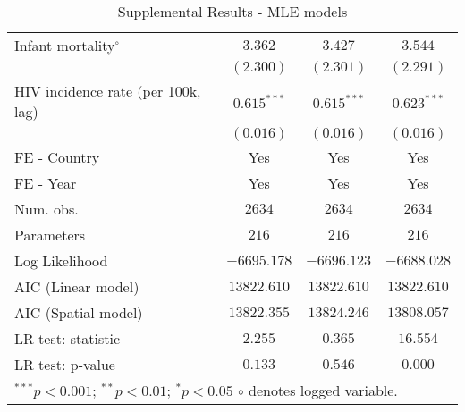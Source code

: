 \begin{sidewaystable}
\begin{center}
{\begin{tabular}{l@{} c@{} c@{} c@{}}
Infant mortality$^{\circ}$                                   & $3.362$        & $3.427$        & $3.544$        \\
                                                             & $(2.300)$      & $(2.301)$      & $(2.291)$      \\
HIV incidence rate (per 100k, lag)                           & $0.615^{***}$  & $0.615^{***}$  & $0.623^{***}$  \\
                                                             & $(0.016)$      & $(0.016)$      & $(0.016)$      \\
\midrule
FE - Country                                                 & Yes            & Yes            & Yes            \\
FE - Year                                                    & Yes            & Yes            & Yes            \\
Num. obs.                                                    & $2634$         & $2634$         & $2634$         \\
Parameters                                                   & $216$          & $216$          & $216$          \\
Log Likelihood                                               & $-6695.178$    & $-6696.123$    & $-6688.028$    \\
AIC (Linear model)                                           & $13822.610$    & $13822.610$    & $13822.610$    \\
AIC (Spatial model)                                          & $13822.355$    & $13824.246$    & $13808.057$    \\
LR test: statistic                                           & $2.255$        & $0.365$        & $16.554$       \\
LR test: p-value                                             & $0.133$        & $0.546$        & $0.000$        \\
\bottomrule
\multicolumn{4}{l}{\scriptsize{$^{***}p<0.001$; $^{**}p<0.01$; $^{*}p<0.05$
$\circ$ denotes logged variable.}}
\end{tabular}
}
\caption{Supplemental Results - MLE models}
\label{table:regressions-appendix-mle}
\end{center}
\end{sidewaystable}
